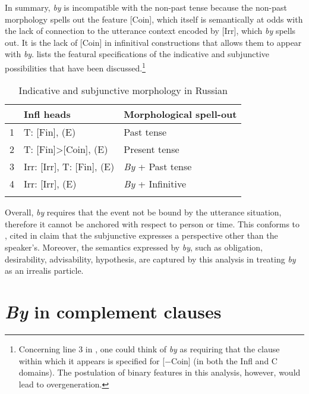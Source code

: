 \documentclass[output=paper,
modfonts,
newtxmath,
hidelinks,
]{langscibook}
\begin{document}
In summary, \textit{by} is incompatible with the non-past tense because the non-past morphology spells out the feature [Coin], which itself is semantically at odds with the lack of connection to the utterance context encoded by [Irr], which \textit{by} spells out. It is the lack of [Coin] in infinitival constructions that allows them to appear with \textit{by}.  lists the featural specifications of the indicative and subjunctive possibilities that have been discussed.\footnote{\label{fn4}Concerning line 3 in , one could think of \textit{by} as requiring that the clause within which it appears is specified for [$-$Coin] (in both the Infl and C domains). The postulation of binary features in this analysis, however, would lead to overgeneration.}

\begin{table}[h]
\caption{Indicative and subjunctive morphology in Russian}
\label{table2}
\begin{tabularx}{.80\textwidth}{rlX}
\lsptoprule
&\textbf{Infl heads} & \textbf{Morphological spell-out}\\
\midrule
1&T: [Fin], (E) & Past tense\\
2&T: [Fin]>[Coin], (E) & Present tense\\
3&Irr: [Irr], T: [Fin], (E) & \textit{By} + Past tense\\
4&Irr: [Irr], (E) & \textit{By} + Infinitive\\
\lspbottomrule
\end{tabularx}
\label{table:table_2}
\end{table}

Overall, \textit{by} requires that the event not be bound by the utterance situation, therefore it cannot be anchored with respect to person or time. This conforms to , cited in \citet[10]{Cowper2002} claim that the subjunctive expresses a perspective other than the speaker’s. Moreover, the semantics expressed by \textit{by}, such as obligation, desirability, advisability, hypothesis, are captured by this analysis in treating \textit{by} as an irrealis particle.



\section{\textit{By} in complement clauses}\label{s5}
\end{document}
